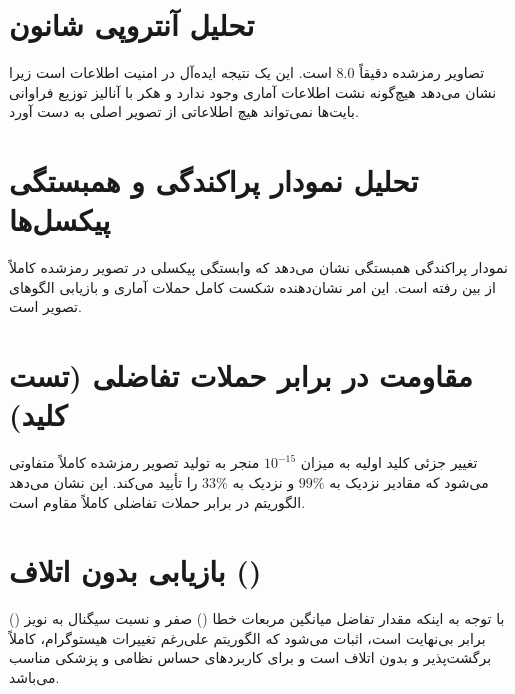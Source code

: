 \section{تحلیل آنتروپی شانون}
 تصاویر رمزشده دقیقاً $8.0$ است. این یک نتیجه ایده‌آل در امنیت اطلاعات است زیرا نشان می‌دهد هیچ‌گونه نشت اطلاعات آماری وجود ندارد و هکر با آنالیز توزیع فراوانی بایت‌ها نمی‌تواند هیچ اطلاعاتی از تصویر اصلی به دست آورد.

\section{تحلیل نمودار پراکندگی و همبستگی پیکسل‌ها}
نمودار پراکندگی همبستگی نشان می‌دهد که وابستگی پیکسلی در تصویر رمزشده کاملاً از بین رفته است. این امر نشان‌دهنده شکست کامل حملات آماری و بازیابی الگوهای تصویر است.

\section{مقاومت در برابر حملات تفاضلی (تست کلید)}
تغییر جزئی کلید اولیه به میزان $10^{-15}$ منجر به تولید تصویر رمزشده کاملاً متفاوتی می‌شود که مقادیر  نزدیک به $99\%$ و  نزدیک به $33\%$ را تأیید می‌کند. این نشان می‌دهد الگوریتم در برابر حملات تفاضلی کاملاً مقاوم است.

\section{بازیابی بدون اتلاف ()}
با توجه به اینکه مقدار تفاضل میانگین مربعات خطا () صفر و نسبت سیگنال به نویز () برابر بی‌نهایت است، اثبات می‌شود که الگوریتم علی‌رغم تغییرات هیستوگرام، کاملاً برگشت‌پذیر و بدون اتلاف است و برای کاربردهای حساس نظامی و پزشکی مناسب می‌باشد.


